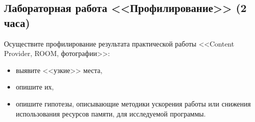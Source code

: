 \subsection{Лабораторная работа <<Профилирование>> (2 часа)}

Осуществите профилирование результата практической работы <<Content Provider, ROOM, фотографии>>: 

\begin{itemize}
	\item выявите <<узкие>> места,
	\item опишите их,
	\item опишите гипотезы, описывающие методики ускорения работы или снижения использования ресурсов памяти, для исследуемой программы.
\end{itemize}
